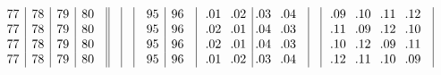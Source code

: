 \documentclass[12pt,a4paper]{amsart}
\begin{document}
\begin{align*}
\begin{array}{r||c|c|c|c|c|c|c|c}
\begin{array}{c|c|c|c}
77&78&79&80\\
77&78&79&80\\
77&78&79&80\\
77&78&79&80\\
      \end{array}
&&&
      \begin{array}{c|c}
95&96\\
95&96\\
95&96\\
95&96\\
      \end{array}
&
      \begin{array}{cc|cc}
\llap{.}01&\llap{.}02&\llap{.}03&\llap{.}04\\
\llap{.}02&\llap{.}01&\llap{.}04&\llap{.}03\\
\llap{.}02&\llap{.}01&\llap{.}04&\llap{.}03\\
\llap{.}01&\llap{.}02&\llap{.}03&\llap{.}04\\
      \end{array}
&&
      \begin{array}{cccc}
\llap{.}09&\llap{.}10&\llap{.}11&\llap{.}12\\
\llap{.}11&\llap{.}09&\llap{.}12&\llap{.}10\\
\llap{.}10&\llap{.}12&\llap{.}09&\llap{.}11\\
\llap{.}12&\llap{.}11&\llap{.}10&\llap{.}09\\
      \end{array}
 \\
  \end{array}
\end{align*}
\end{document}
